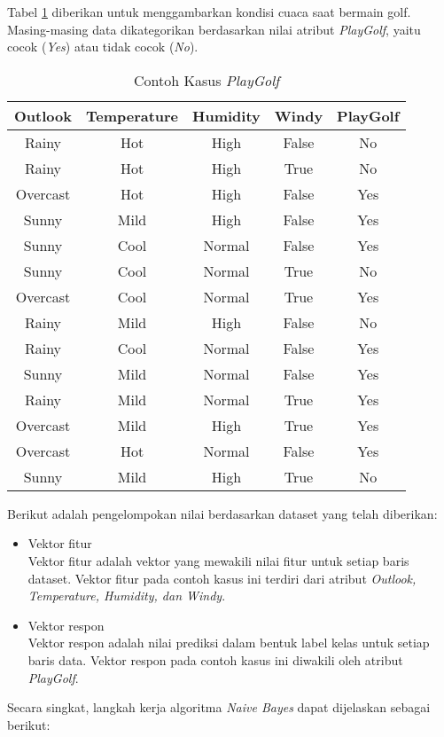 \vspace{0.3cm}

\noindent Tabel \ref{table:naivedataset} diberikan untuk menggambarkan kondisi cuaca saat bermain golf. Masing-masing data dikategorikan berdasarkan nilai atribut \textit{PlayGolf}, yaitu cocok (\textit{Yes}) atau tidak cocok (\textit{No}). 

\begin{table}[h]
\centering
\caption{Contoh Kasus \textit{PlayGolf}}
\begin{tabular}{|c|c|c|c|c|}
\hline 
Outlook & Temperature & Humidity & Windy & PlayGolf \\ 
\hline 
Rainy & Hot & High & False & No \\ 
\hline 
Rainy & Hot & High & True & No \\ 
\hline 
Overcast & Hot & High & False & Yes \\ 
\hline 
Sunny & Mild & High & False & Yes \\ 
\hline 
Sunny & Cool & Normal & False & Yes \\ 
\hline 
Sunny & Cool & Normal & True & No \\ 
\hline 
Overcast & Cool & Normal & True & Yes \\ 
\hline 
Rainy & Mild & High & False & No \\ 
\hline 
Rainy & Cool & Normal & False & Yes \\ 
\hline 
Sunny & Mild & Normal & False & Yes \\ 
\hline 
Rainy & Mild & Normal & True & Yes \\ 
\hline 
Overcast & Mild & High & True & Yes \\ 
\hline 
Overcast & Hot & Normal & False & Yes \\ 
\hline 
Sunny & Mild & High & True & No \\ 
\hline 
\end{tabular} 
\label{table:naivedataset}
\end{table}

\noindent Berikut adalah pengelompokan nilai berdasarkan dataset yang telah diberikan:

\begin{itemize}

\item 
Vektor fitur\\
Vektor fitur adalah vektor yang mewakili nilai fitur untuk setiap baris dataset. Vektor fitur pada contoh kasus ini terdiri dari atribut \textit{Outlook, Temperature, Humidity, dan Windy}.

\item
Vektor respon\\
Vektor respon adalah nilai prediksi dalam bentuk label kelas untuk setiap baris data. Vektor respon pada contoh kasus ini diwakili oleh atribut \textit{PlayGolf}.

\end{itemize}
\vspace{0.5cm}
\noindent Secara singkat, langkah kerja algoritma \textit{Naive Bayes} dapat dijelaskan sebagai berikut:

